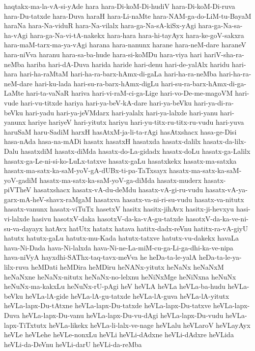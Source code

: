 {haqtakx-ma-la-vA-si-yAde
hara
hara-Di-koM-Di-hudiV
hara-Di-koM-Di-ruva
hara-Du-tatxde
hara-Duva
haraH
hara-Li-naMte
hara-NAM-ga-do-LiM-tu-BayaM
haraNa
hara-Na-viduR
hara-Na-vilalx
hara-ga-Na-sA-kiSx-yAgi
hara-ga-Na-sa-ha-vAgi
hara-ga-Na-vi-tA-nakekx
hara-hara
hara-hi-tayAyx
hara-ke-goV-sakxra
hara-maM-tarx-ma-ya-vAgi
harana
hara-nanunx
harane
hara-neM-dare
haraneV
hara-niVva
haranu
hara-sa-ba-hude
hara-si-koMDu
hara-viya
hari
hariV-sha-ra-neMba
hariba
hari-dA-Duva
harida
haride
hari-denu
hari-de-yalAlx
haridu
hari-hara
hari-ha-raMtaM
hari-ha-ra-barx-hAmx-di-gaLa
hari-ha-ra-neMba
hari-ha-ra-neM-dare
hari-ku-lada
hari-su-ra-barx-hAmx-digLu
hari-su-ra-barx-hAmx-di-ga-LaMte
hari-ta-vaNaR
hariva
hari-vi-raM-ci-ga-Lige
hari-vo-De-me-magoVM
hari-vude
hari-vu-titxde
hariya
hari-ya-beV-kA-dare
hari-ya-beVku
hari-ya-di-ra-beVku
hari-yadu
hari-ya-jeVMdarx
hari-yalalx
hari-ya-lalxde
hari-yanu
hari-yanunx
hariye
hariyeV
hari-yitutx
hariyu
hari-yu-titx-ru-titx-ru-vudu
hari-yuva
haruSaM
haru-SadiM
harxH
hasAtxM-ja-li-ta-rAgi
hasAtxshacx
hasa-ge-Disi
hasa-nAda
hasa-na-mADi
hasatx
hasatxH
hasatxda
hasatx-dalilx
hasatx-da-lilx-Dalu
hasatxdiM
hasatx-diMda
hasatx-do-La-gidadx
hasatx-doLu
hasatx-ga-Lalilx
hasatx-ga-Le-ni-si-ko-LuLx-tatxve
hasatx-gaLu
hasatxkekx
hasatx-ma-satxka
hasatx-ma-satx-ka-saM-yoV-gA-dUBx-ti-pa-TaTxsayx
hasatx-ma-satx-ka-saM-yoV-gadiM
hasatx-ma-satx-ka-saM-yoV-ga-diMda
hasatx-muderx
hasatx-piVTheV
hasatxshacx
hasatx-vA-du-deMdu
hasatx-vA-gi-ru-vudu
hasatx-vA-ya-garx-mA-heV-shavx-raMgaM
hasatxva
hasatx-va-ni-ri-su-vudu
hasatx-va-nitutx
hasatx-vanunx
hasatx-viTuTx
hasetxV
hasitx
hasitx-jihAvx
hasitx-ji-hevxyu
hasi-vi-lalxde
hasivu
hasotxV-daka
hasotxV-da-ka-vA-gu-tatxde
hasotxV-da-ka-ve-ni-su-va-dayayx
hatAvx
hatUtx
hatatx
hatava
hatitx-dadx-reVnu
hatitx-ra-vA-giyU
hatutx
hatutx-gaLu
hatutx-mu-Kada
hatutx-tatxve
hatutx-vu-dakekx
havaLa
hava-Ni-Dada
hava-Ni-lalxda
hava-Ni-ne-La-miM-cu-ga-Li-ga-dhi-ka-ve-nipa
hava-niVyA
hayxdhi-SAThx-taq-tavx-meVva
he
heDa-ta-le-yalA
heDa-ta-le-ya-lilx-ruva
heMDati
heMDira
heMDiru
heNANx-yitutx
heNaNx
heNaNxM
heNaNxne
heNaNx-nitutx
heNaNx-no-lelxnu
heNiNxMge
heNiNxna
heNuNx
heNuNx-ma-kakxLu
heNuNx-rU-pAgi
heV
heVLA
heVLa
heVLa-ba-hudu
heVLa-beVku
heVLa-lA-gide
heVLa-lA-gu-tatxde
heVLa-lA-guva
heVLa-lA-yitutx
heVLa-lapx-Du-tAtxne
heVLa-lapx-Du-tatxde
heVLa-lapx-Du-tatxve
heVLa-lapx-Duva
heVLa-lapx-Du-vanu
heVLa-lapx-Du-vu-dAgi
heVLa-lapx-Du-vudu
heVLa-lapx-TiTxtutx
heVLa-likekx
heVLa-li-lalx-ve-nage
heVLalu
heVLaroV
heVLayAyx
heVLe
heVLehe
heVLe-nonxLu
heVLi
heVLi-dAdxne
heVLi-dAdxre
heVLida
heVLi-da-DeVnu
heVLi-darU
heVLi-da-reMba
}
